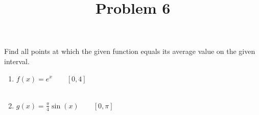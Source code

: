 \documentclass{ximera}
\title[Problem 6]{Problem 6}
\begin{document}
\begin{abstract} \end{abstract}
\maketitle

\begin{problem}

  Find all points at which the given function equals its average value on the given interval.
  \begin{enumerate}
    \item $f(x) = e^x	\qquad	[0,4]$ \\ \\
		\item $g(x) = \frac{\pi}{4} \sin(x)	\qquad	[0,\pi]$
		\end{enumerate}
\end{problem}
\end{document}
